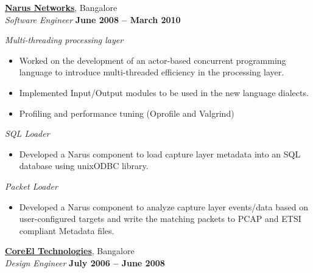 \documentclass[9pt]{article}
\newcommand{\blankline}{\quad\pagebreak[2]}
\begin{document}
    \href{http://www.narus.com/}{\textbf{Narus Networks}}, Bangalore \vspace{2mm}\\\vspace{1mm}%
    \textsl{Software Engineer} \hfill \textbf{June 2008 -- March 2010}%
	
	\blankline
	
	\textsl{Multi-threading processing layer}
	\begin{itemize}
		\item Worked on the development of an actor-based concurrent programming language to introduce multi-threaded efficiency in the processing layer.%
		\item Implemented Input/Output modules to be used in the new language dialects.%
		\item Profiling and performance tuning (Oprofile and Valgrind) %
	\end{itemize}

	\blankline

	\textsl{SQL Loader}
	\begin{itemize}
		\item Developed a Narus component to load capture layer metadata into an SQL database using unixODBC library. %
	\end{itemize}

	\pagebreak

	\textsl{Packet Loader}
	\begin{itemize}
		\item Developed a Narus component to analyze capture layer events/data based on user-configured targets and write the matching packets to PCAP and ETSI compliant Metadata files. \vspace{0mm}\\\vspace{1mm}%
	\end{itemize} 
 

    \href{http://www.coreel.com/}{\textbf{CoreEl Technologies}}, Bangalore \vspace{2mm}\\\vspace{1mm}%
    \textsl{Design Engineer} \hfill \textbf{July 2006 -- June 2008}%
    
    \blankline
	
\end{document}
